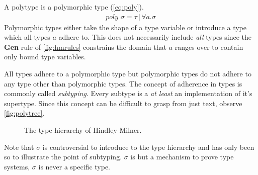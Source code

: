 \documentclass[11pt,oneside,a4paper]{report}
\begin{document}
A polytype is a polymorphic type (\autoref{eq:poly}).
\begin{align}
	poly \,\, \sigma = \tau \,|\, \forall a . \sigma
	\label{eq:poly}
\end{align}
Polymorphic types either take the shape of a type variable or introduce a type which all types $a$ adhere to. 
This does not necessarily include \textit{all} types since the \textbf{Gen} rule of \autoref{fig:hmrules} constrains the domain that $a$ ranges over to contain only bound type variables.
\begin{remark}
    All types adhere to a polymorphic type but polymorphic types do not adhere to any type other than polymorphic types.
    The concept of adherence in types is commonly called \textit{subtyping}.
    Every subtype is a \textit{at least} an implementation of it's supertype.
    Since this concept can be difficult to grasp from just text, observe \autoref{fig:polytree}.
    \begin{figure}[ht]
        \centering
        \caption{The type hierarchy of Hindley-Milner.}
        \label{fig:polytree}
    \end{figure}
    Note that $\sigma$ is controversial to introduce to the type hierarchy and has only been so to illustrate the point of subtyping.
    $\sigma$ is but a mechanism to prove type systems, $\sigma$ is never a specific type.

\end{remark}
\end{document}
